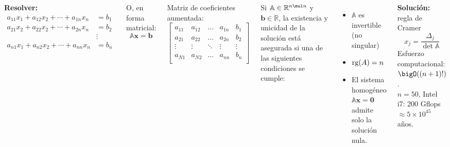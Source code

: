 \documentclass[9pt, aspectratio=169]{beamer}
\begin{document}
\begin{frame}
	\begin{columns}[t]
		\textbf{Resolver:}
		\begin{align*}
			a_{11}x_1+a_{12}x_2+\cdots +a_{1n}x_n & = b_1  \\
			a_{21}x_2+a_{22}x_2+\cdots +a_{2n}x_n & = b_2  \\
			                                      & \vdots \\
			a_{n1}x_1+a_{n2}x_2+\cdots +a_{nn}x_n & = b_n  \\
		\end{align*} \pause
		\vspace{-2em}

		O, en forma matricial:
		\begin{equation*}
			\mathbb{A} \mathbf{x} = \mathbf{b}
		\end{equation*}  \pause
		\vspace{-1em}

		Matriz de coeficientes aumentada:
		\begin{equation*}
			\left[
				\begin{array}{cccc|c}
					a_{11} & a_{12} & \ldots & a_{1n} & b_1    \\
					a_{21} & a_{22} & \ldots & a_{2n} & b_2    \\
					\vdots & \vdots & \ddots & \vdots & \vdots \\
					a_{N1} & a_{N2} & \ldots & a_{nn} & b_n    \\
				\end{array} \right]
		\end{equation*} \pause


		Si $\mathbb{A} \in \mathbb{R}^{n \mul n}$ y $\bm{b} \in \mathbb{R}$, la existencia y unicidad de la solución está asegurada si una de las siguientes condiciones se cumple:
		\begin{itemize}
			\item $\mathbb{A}$ es invertible (no singular)
			\item $\operatorname{rg}(A) = n$
			\item El sistema homogéneo $\mathbb{A} \bm{x} = \bm{0}$ admite solo la solución nula.
		\end{itemize}

		\hrulefill \pause \vspace{1em}


		\textbf{Solución:} regla de Cramer
		\[ x_j = \frac{\Delta_j}{\det{\mathbb{A}}} \]
		Esfuerzo computacional: $\bigO((n+ 1)!)$. \\
		$n = 50$, Intel i7: 200 Gflops $\approx 5 \times 10^{45}$ años.

	\end{columns}
\end{frame}
\end{document}
